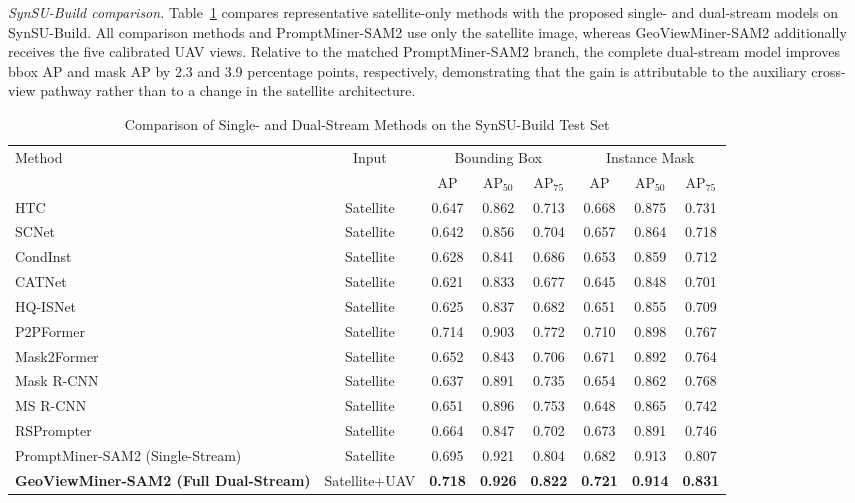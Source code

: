 \documentclass[letterpaper,journal]{IEEEtran}
\begin{document}
\noindent\textit{SynSU-Build comparison.}
Table~\ref{tab:synsu_dual} compares representative satellite-only methods with the proposed single- and dual-stream models on SynSU-Build. All comparison methods and PromptMiner-SAM2 use only the satellite image, whereas GeoViewMiner-SAM2 additionally receives the five calibrated UAV views. Relative to the matched PromptMiner-SAM2 branch, the complete dual-stream model improves bbox AP and mask AP by 2.3 and 3.9 percentage points, respectively, demonstrating that the gain is attributable to the auxiliary cross-view pathway rather than to a change in the satellite architecture.

\begin{table}[!t]
\caption{Comparison of Single- and Dual-Stream Methods on the SynSU-Build Test Set}
\label{tab:synsu_dual}
\centering
\small
\begin{tabular}{lccccccc}
\toprule
\multirow{2}{*}{Method} & \multirow{2}{*}{Input} & \multicolumn{3}{c}{Bounding Box} & \multicolumn{3}{c}{Instance Mask} \\
\cmidrule(lr){3-5}\cmidrule(lr){6-8}
& & AP & AP$_{50}$ & AP$_{75}$ & AP & AP$_{50}$ & AP$_{75}$ \\
\midrule
HTC~\cite{ref_htc} & Satellite & 0.647 & 0.862 & 0.713 & 0.668 & 0.875 & 0.731 \\
SCNet~\cite{ref_scnet} & Satellite & 0.642 & 0.856 & 0.704 & 0.657 & 0.864 & 0.718 \\
CondInst~\cite{ref_condinst} & Satellite & 0.628 & 0.841 & 0.686 & 0.653 & 0.859 & 0.712 \\
CATNet~\cite{ref_catnet} & Satellite & 0.621 & 0.833 & 0.677 & 0.645 & 0.848 & 0.701 \\
HQ-ISNet~\cite{ref_hqisnet} & Satellite & 0.625 & 0.837 & 0.682 & 0.651 & 0.855 & 0.709 \\
P2PFormer~\cite{ref_p2pformer} & Satellite & 0.714 & 0.903 & 0.772 & 0.710 & 0.898 & 0.767 \\
Mask2Former~\cite{ref_mask2former} & Satellite & 0.652 & 0.843 & 0.706 & 0.671 & 0.892 & 0.764 \\
Mask R-CNN~\cite{ref_maskrcnn} & Satellite & 0.637 & 0.891 & 0.735 & 0.654 & 0.862 & 0.768 \\
MS R-CNN~\cite{ref_msrcnn} & Satellite & 0.651 & 0.896 & 0.753 & 0.648 & 0.865 & 0.742 \\
RSPrompter~\cite{ref_rsprompter} & Satellite & 0.664 & 0.847 & 0.702 & 0.673 & 0.891 & 0.746 \\
PromptMiner-SAM2 (Single-Stream) & Satellite & 0.695 & 0.921 & 0.804 & 0.682 & 0.913 & 0.807 \\
\textbf{GeoViewMiner-SAM2 (Full Dual-Stream)} & Satellite+UAV & \textbf{0.718} & \textbf{0.926} & \textbf{0.822} & \textbf{0.721} & \textbf{0.914} & \textbf{0.831} \\
\bottomrule
\end{tabular}
\end{table}
\end{document}
